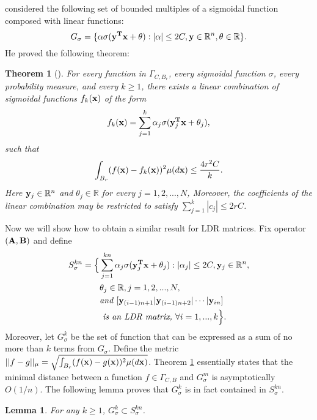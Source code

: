 \documentclass{article}
\newtheorem{theorem}{Theorem}[section]
\newtheorem{lemma}{Lemma}[section]
\begin{document}
\cite{barron1993universal} considered the following set of bounded multiples of a sigmoidal function composed with linear functions:
\begin{equation}
G_\sigma = \{\alpha \sigma({\bf y^Tx} + \theta): |\alpha|\le 2C, {\bf y}\in\mathbb{R}^n, \theta\in\mathbb{R}\}.
\end{equation}
He proved the following theorem:
\begin{theorem}[\cite{barron1993universal}]
\label{ErrorBd}
For every function in $\Gamma_{C, B_r}$, every sigmoidal function $\sigma$, every probability measure, and every $k\ge 1$, there exists a linear combination of sigmoidal functions $f_k({\bf x})$ of the form
\begin{equation}
f_k({\bf x}) = \sum_{j=1}^k \alpha_j \sigma({\bf y}_j^{\bf T}{\bf x} + \theta_j),
\end{equation}
such that
\begin{equation}
\int_{B_r}(f({\bf x})-f_k({\bf x}))^2\mu(d{\bf x})\le \frac{4r^2C}{k}.
\end{equation}
Here ${\bf y}_j\in\mathbb{R}^n$ and $\theta_j\in\mathbb{R}$ for every $j=1,2,...,N$,
Moreover, the coefficients of the linear combination may be restricted to satisfy $\sum_{j=1}^k|c_j|\le 2rC$.
\end{theorem}
Now we will show how to obtain a similar result for LDR matrices. Fix operator $({\bf A, B})$ and define
\begin{equation}
\aligned
S^{kn}_\sigma = \Big\{&\sum_{j=1}^{kn}\alpha_j \sigma({\bf y}_j^{\bf T}{\bf x} + \theta_j): |\alpha_j|\le 2C, {\bf y}_j\in\mathbb{R}^n,\\
& \theta_j\in\mathbb{R}, j=1,2,...,N, \\
&\textit{and }[{\bf y}_{(i-1)n+1}|{\bf y}_{(i-1)n+2}|\cdots|{\bf y}_{in}]\\
&\textit{ is an LDR matrix, }\forall i=1,...,k\Big\}.
\endaligned
\end{equation}
Moreover, let $G^{k}_\sigma$ be the set of function that can be expressed as a sum of no more than $k$ terms from $G_\sigma$. Define the metric $||f-g||_\mu = \sqrt{\int_{B_r}(f({\bf x})-g({\bf x}))^2\mu(d{\bf x})}$. Theorem \ref{ErrorBd} essentially states that the minimal distance between a function $f\in\Gamma_{C,B}$ and $G^{m}_\sigma$ is asymptotically $O(1/n)$. The following lemma proves that $G^{k}_\sigma$ is in fact contained in $S^{kn}_\sigma$.
\begin{lemma}
\label{lldr}
For any $k\ge 1$, $G^{k}_\sigma\subset S^{kn}_\sigma$.
\end{lemma}
\end{document}
